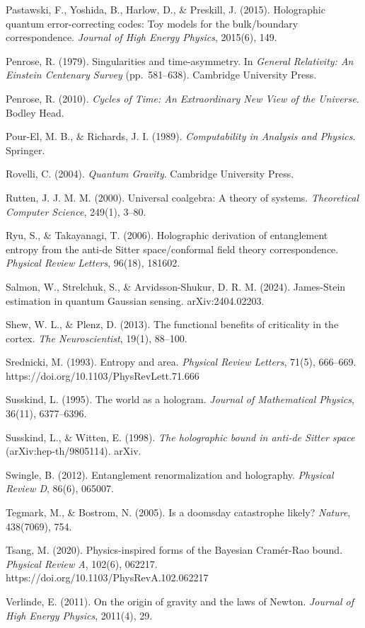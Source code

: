 \documentclass[
]{article}
\begin{document}
Pastawski, F., Yoshida, B., Harlow, D., \& Preskill, J. (2015).
Holographic quantum error-correcting codes: Toy models for the
bulk/boundary correspondence. \emph{Journal of High Energy Physics},
2015(6), 149.

Penrose, R. (1979). Singularities and time-asymmetry. In \emph{General
Relativity: An Einstein Centenary Survey} (pp.~581--638). Cambridge
University Press.

Penrose, R. (2010). \emph{Cycles of Time: An Extraordinary New View of
the Universe}. Bodley Head.

Pour-El, M. B., \& Richards, J. I. (1989). \emph{Computability in
Analysis and Physics}. Springer.

Rovelli, C. (2004). \emph{Quantum Gravity}. Cambridge University Press.

Rutten, J. J. M. M. (2000). Universal coalgebra: A theory of systems.
\emph{Theoretical Computer Science}, 249(1), 3--80.

Ryu, S., \& Takayanagi, T. (2006). Holographic derivation of
entanglement entropy from the anti-de Sitter space/conformal field
theory correspondence. \emph{Physical Review Letters}, 96(18), 181602.

Salmon, W., Strelchuk, S., \& Arvidsson-Shukur, D. R. M. (2024).
James-Stein estimation in quantum Gaussian sensing. arXiv:2404.02203.

Shew, W. L., \& Plenz, D. (2013). The functional benefits of criticality
in the cortex. \emph{The Neuroscientist}, 19(1), 88--100.

Srednicki, M. (1993). Entropy and area. \emph{Physical Review Letters},
71(5), 666--669. https://doi.org/10.1103/PhysRevLett.71.666

Susskind, L. (1995). The world as a hologram. \emph{Journal of
Mathematical Physics}, 36(11), 6377--6396.

Susskind, L., \& Witten, E. (1998). \emph{The holographic bound in
anti-de Sitter space} (arXiv:hep-th/9805114). arXiv.

Swingle, B. (2012). Entanglement renormalization and holography.
\emph{Physical Review D}, 86(6), 065007.

Tegmark, M., \& Bostrom, N. (2005). Is a doomsday catastrophe likely?
\emph{Nature}, 438(7069), 754.

Tsang, M. (2020). Physics-inspired forms of the Bayesian Cramér-Rao
bound. \emph{Physical Review A}, 102(6), 062217.
https://doi.org/10.1103/PhysRevA.102.062217

Verlinde, E. (2011). On the origin of gravity and the laws of Newton.
\emph{Journal of High Energy Physics}, 2011(4), 29.
\end{document}
